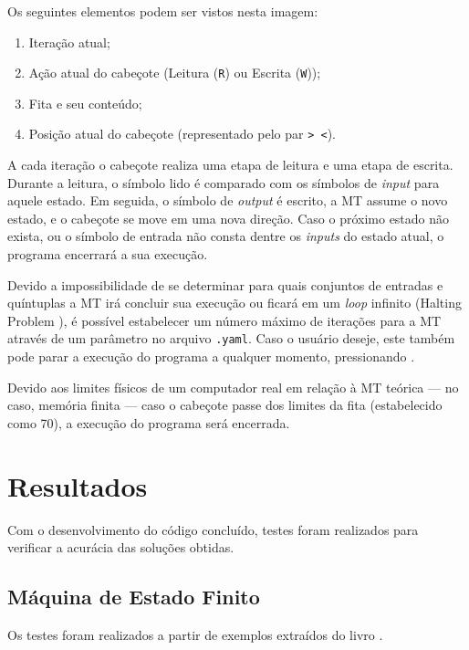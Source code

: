Os seguintes elementos podem ser vistos nesta imagem:

\begin{enumerate}
    \item Iteração atual;
    \item Ação atual do cabeçote (Leitura (\verb|R|) ou Escrita (\verb|W|));
    \item Fita e seu conteúdo;
    \item Posição atual do cabeçote (representado pelo par \verb|> <|).
\end{enumerate}

A cada iteração o cabeçote realiza uma etapa de leitura e uma etapa de escrita.
Durante a leitura, o símbolo lido é comparado com os símbolos de \textit{input}
para aquele estado. Em seguida, o símbolo de \textit{output} é escrito, a MT
assume o novo estado, e o cabeçote se move em uma nova direção. Caso o próximo
estado não exista, ou o símbolo de entrada não consta dentre os \textit{inputs}
do estado atual, o programa encerrará a sua execução.

Devido a impossibilidade de se determinar para quais conjuntos de entradas e
quíntuplas a MT irá concluir sua execução ou ficará em um \textit{loop} infinito
(Halting Problem \cite{turing}), é possível estabelecer um número máximo de
iterações para a MT através de um parâmetro no arquivo \verb|.yaml|. Caso o
usuário deseje, este também pode parar a execução do programa a qualquer
momento, pressionando \linebreak {}.

Devido aos limites físicos de um computador real em relação à MT teórica --- no
caso, memória finita --- caso o cabeçote passe dos limites da fita (estabelecido
como 70), a execução do programa será encerrada.

\section{Resultados}

Com o desenvolvimento do código concluído, testes foram realizados para
verificar a acurácia das soluções obtidas.

\subsection{Máquina de Estado Finito}

Os testes foram realizados a partir de exemplos extraídos do livro
\cite[cap.\ 9.3]{judith}.

